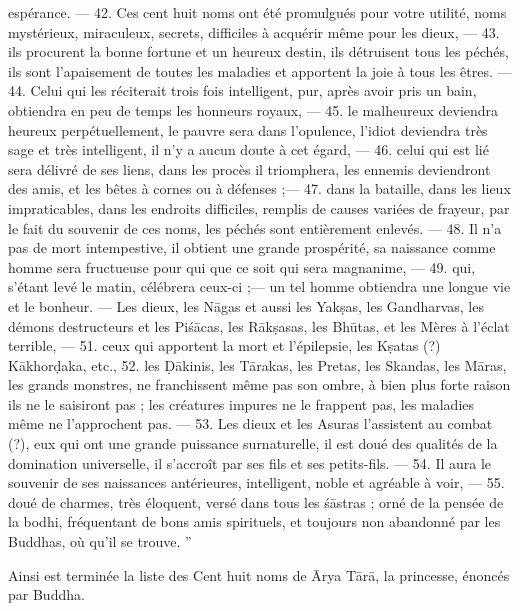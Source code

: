 \documentclass[a4paper, 11pt, oneside, french]{article}
\begin{document}
espérance. --- 42. Ces cent huit noms ont été promulgués pour votre utilité, noms mystérieux, miraculeux, secrets, difficiles à acquérir même pour les dieux, --- 43. ils procurent la bonne fortune et un heureux destin, ils détruisent tous les péchés, ils sont l'apaisement de toutes les maladies et apportent la joie à tous les êtres. --- 44. Celui qui les réciterait trois fois intelligent, pur, après avoir pris un bain, obtiendra en peu de temps les honneurs royaux, --- 45. le malheureux deviendra heureux perpétuellement, le pauvre sera dans l'opulence, l'idiot deviendra très sage et très intelligent, il n'y a aucun doute à cet égard, --- 46. celui qui est lié sera délivré de ses liens, dans les procès il triomphera, les ennemis deviendront des amis, et les bêtes à cornes ou à défenses ;--- 47. dans la bataille, dans les lieux impraticables, dans les endroits difficiles, remplis de causes variées de frayeur, par le fait du souvenir de ces noms, les péchés sont entièrement enlevés. --- 48. Il n'a pas de mort intempestive, il obtient une grande prospérité, sa naissance comme homme sera fructueuse pour qui que ce soit qui sera magnanime, --- 49. qui, s'étant levé le matin, célébrera ceux-ci ;--- un tel homme obtiendra une longue vie et le bonheur. --- Les dieux, les N\={a}gas et aussi les Yak\d{s}as, les Gandharvas, les démons destructeurs et les Pi\'{s}\={a}cas, les R\={a}k\d{s}asas, les Bh\={u}tas, et les Mères à l'éclat terrible, --- 51. ceux qui apportent la mort et l'épilepsie, les K\d{s}atas (?) K\={a}khor\d{d}aka, etc., 52. les Ḍ\={a}kinis, les T\={a}rakas, les Pretas, les Skandas, les M\={a}ras, les grands monstres, ne franchissent même pas son ombre, à bien plus forte raison ils ne le saisiront pas ; les créatures impures ne le frappent pas, les maladies même ne l'approchent pas. --- 53. Les dieux et les Asuras l'assistent au combat (?), eux qui ont une grande puissance surnaturelle, il est doué des qualités de la domination universelle, il s'accroît par ses fils et ses petits-fils. --- 54. Il aura le souvenir de ses naissances antérieures, intelligent, noble et agréable à voir, --- 55. doué de charmes, très éloquent, versé dans tous les \'{s}\={a}stras ; orné de la pensée de la bodhi, fréquentant de bons amis spirituels, et toujours non abandonné par les Buddhas, où qu'il se trouve. ''

Ainsi est terminée la liste des Cent huit noms de \={A}rya T\={a}r\={a}, la princesse, énoncés par Buddha.
\clearpage
\end{document}
